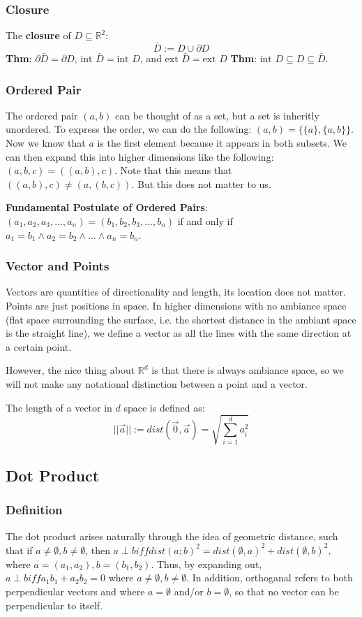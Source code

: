 \subsubsection{Closure}
The \textbf{closure} of $D \subseteq \mathbb{R}^2$:
$$\bar{D} := D \cup \partial D$$
\textbf{Thm}: $\partial \bar{D} = \partial D$, $\text{int } \bar{D} =
\text{int } D$, and $\text{ext } \bar{D} = \text{ext } D$
\textbf{Thm}: $\text{int } D \subseteq D \subseteq \bar{D}$.

\subsubsection{Ordered Pair}
The ordered pair $(a, b)$ can be thought of as a set, but a set is inheritly
unordered. To express the order, we can do the following: $(a, b) = \{\{a\},
\{a, b\}\}$. Now we know that $a$ is the first element because it appears in
both subsets.
We can then expand this into higher dimensions like the following:
$(a, b, c) = ((a, b), c)$. Note that this means that $((a, b), c) \neq (a, (b,
c))$. But this does not matter to us.

\textbf{Fundamental Postulate of Ordered Pairs}:
$(a_1, a_2, a_3, \dots, a_n) = (b_1, b_2, b_3, \dots, b_n)$ if and only if $a_1
= b_1 \wedge a_2 = b_2 \wedge \dots \wedge a_n = b_n$.

\subsubsection{Vector and Points}
Vectors are quantities of directionality and length, its location does not
matter. Points are just positions in space. In higher dimensions with no
ambiance space (flat space surrounding the surface, i.e. the shortest distance
in the ambiant space is the straight line),  we define a vector as all
the lines with the same direction at a certain point.

However, the nice thing about $\mathbb{R}^d$ is that there is always ambiance
space, so we will not make any notational distinction between a point and a
vector.

The length of a vector in $d$ space is defined as:
$$||\vec{a}|| := dist(\vec{0}, \vec{a}) = \sqrt{\sum_{i =
1}^d a_i^2}$$

\subsection{Dot Product}
\subsubsection{Definition}
The dot product arises naturally through the idea of geometric distance, such that if $a \neq \emptyset, b \neq \emptyset$, then $a \perp b iff dist(a; b)^2 = dist(\emptyset, a)^2 + dist(\emptyset, b)^2$, where $a = (a_1, a_2), b = (b_1, b_2)$. Thus, by expanding out, $a \perp b iff a_1b_1 + a_2b_2 = 0$ where $a \neq \emptyset, b \neq \emptyset$. In addition, orthoganal refers to both perpendicular vectors and where $a = \emptyset$ and/or $b = \emptyset$, so that no vector can be perpendicular to itself.

